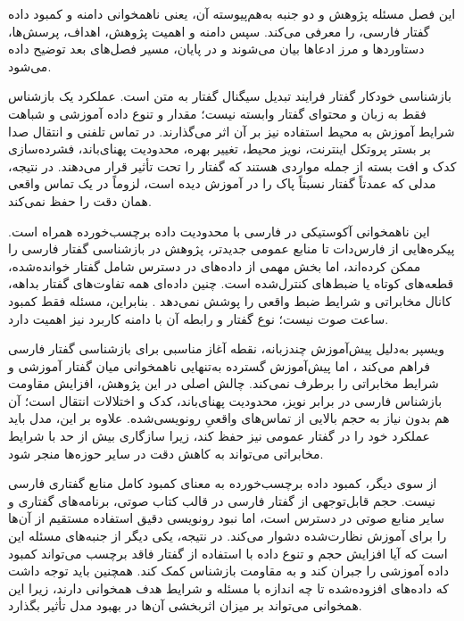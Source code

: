 
این فصل مسئله پژوهش و دو جنبه به‌هم‌پیوسته آن، یعنی ناهمخوانی دامنه و کمبود داده گفتار فارسی، را معرفی می‌کند. سپس دامنه و اهمیت پژوهش، اهداف، پرسش‌ها، دستاوردها و مرز ادعاها بیان می‌شوند و در پایان، مسیر فصل‌های بعد توضیح داده می‌شود.



بازشناسی خودکار گفتار فرایند تبدیل سیگنال گفتار به متن است. عملکرد یک بازشناس فقط به زبان و محتوای گفتار وابسته نیست؛ مقدار و تنوع داده آموزشی و شباهت شرایط آموزش به محیط استفاده نیز بر آن اثر می‌گذارند. در تماس تلفنی و انتقال صدا بر بستر پروتکل اینترنت، نویز محیط، تغییر بهره، محدودیت پهنای‌باند، فشرده‌سازی کدک و افت بسته از جمله مواردی هستند که گفتار را تحت تأثیر قرار می‌دهند. در نتیجه، مدلی که عمدتاً گفتار نسبتاً پاک را در آموزش دیده است، لزوماً در یک تماس واقعی همان دقت را حفظ نمی‌کند.

این ناهمخوانی آکوستیکی در فارسی با محدودیت داده برچسب‌خورده همراه است. پیکره‌هایی از فارس‌دات تا منابع عمومی جدیدتر، پژوهش در بازشناسی گفتار فارسی را ممکن کرده‌اند، اما بخش مهمی از داده‌های در دسترس شامل گفتار خوانده‌شده، قطعه‌های کوتاه یا ضبط‌های کنترل‌شده است. چنین داده‌ای همه تفاوت‌های گفتار بداهه، کانال مخابراتی و شرایط ضبط واقعی را پوشش نمی‌دهد . بنابراین، مسئله فقط کمبود ساعت صوت نیست؛ نوع گفتار و رابطه آن با دامنه کاربرد نیز اهمیت دارد.

ویسپر به‌دلیل پیش‌آموزش چندزبانه، نقطه آغاز مناسبی برای بازشناسی گفتار فارسی فراهم می‌کند ، اما پیش‌آموزش گسترده به‌تنهایی ناهمخوانی میان گفتار آموزشی و شرایط مخابراتی را برطرف نمی‌کند. چالش اصلی در این پژوهش، افزایش مقاومت بازشناس فارسی در برابر نویز، محدودیت پهنای‌باند، کدک و اختلالات انتقال است؛ آن هم بدون نیاز به حجم بالایی از تماس‌های واقعیِ رونویسی‌شده. علاوه بر این، مدل باید عملکرد خود را در گفتار عمومی نیز حفظ کند، زیرا سازگاری بیش از حد با شرایط مخابراتی می‌تواند به کاهش دقت در سایر حوزه‌ها منجر شود.

از سوی دیگر، کمبود داده برچسب‌خورده به معنای کمبود کامل منابع گفتاری فارسی نیست. حجم قابل‌توجهی از گفتار فارسی در قالب کتاب صوتی، برنامه‌های گفتاری و سایر منابع صوتی در دسترس است، اما نبود رونویسی دقیق استفاده مستقیم از آن‌ها را برای آموزش نظارت‌شده دشوار می‌کند. در نتیجه، یکی دیگر از جنبه‌های مسئله این است که آیا افزایش حجم و تنوع داده با استفاده از گفتار فاقد برچسب می‌تواند کمبود داده آموزشی را جبران کند و به مقاومت بازشناس کمک کند. همچنین باید توجه داشت که داده‌های افزوده‌شده تا چه اندازه با مسئله و شرایط هدف همخوانی دارند، زیرا این همخوانی می‌تواند بر میزان اثربخشی آن‌ها در بهبود مدل تأثیر بگذارد.

